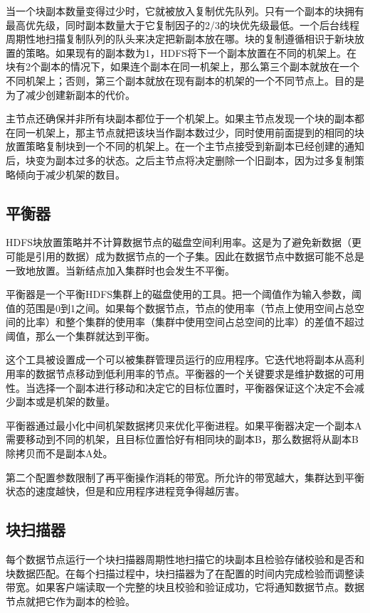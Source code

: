当一个块副本数量变得过少时，它就被放入复制优先队列。只有一个副本的块拥有最高优先级，同时副本数量大于它复制因子的2/3的块优先级最低。一个后台线程周期性地扫描复制队列的队头来决定把新副本放在哪。块的复制遵循相识于新块放置的策略。如果现有的副本数为1，HDFS将下一个副本放置在不同的机架上。在块有2个副本的情况下，如果连个副本在同一机架上，那么第三个副本就放在一个不同机架上；否则，第三个副本就放在现有副本的机架的一个不同节点上。目的是为了减少创建新副本的代价。

主节点还确保并非所有块副本都位于一个机架上。如果主节点发现一个块的副本都在同一机架上，那主节点就把该块当作副本数过少，同时使用前面提到的相同的块放置策略复制块到一个不同的机架上。在一个主节点接受到新副本已经创建的通知后，块变为副本过多的状态。之后主节点将决定删除一个旧副本，因为过多复制策略倾向于减少机架的数目。

\subsection{平衡器}

HDFS块放置策略并不计算数据节点的磁盘空间利用率。这是为了避免新数据（更可能是引用的数据）成为数据节点的一个子集。因此在数据节点中数据可能不总是一致地放置。当新结点加入集群时也会发生不平衡。

平衡器是一个平衡HDFS集群上的磁盘使用的工具。把一个阈值作为输入参数，阈值的范围是0到1之间。如果每个数据节点，节点的使用率（节点上使用空间占总空间的比率）和整个集群的使用率（集群中使用空间占总空间的比率）的差值不超过阈值，那么一个集群就达到平衡。

这个工具被设置成一个可以被集群管理员运行的应用程序。它迭代地将副本从高利用率的数据节点移动到低利用率的节点。平衡器的一个关键要求是维护数据的可用性。当选择一个副本进行移动和决定它的目标位置时，平衡器保证这个决定不会减少副本或是机架的数量。

平衡器通过最小化中间机架数据拷贝来优化平衡进程。如果平衡器决定一个副本A需要移动到不同的机架，且目标位置恰好有相同块的副本B，那么数据将从副本B除拷贝而不是副本A处。

第二个配置参数限制了再平衡操作消耗的带宽。所允许的带宽越大，集群达到平衡状态的速度越快，但是和应用程序进程竞争得越厉害。

\subsection{块扫描器}

每个数据节点运行一个块扫描器周期性地扫描它的块副本且检验存储校验和是否和块数据匹配。在每个扫描过程中，块扫描器为了在配置的时间内完成检验而调整读带宽。如果客户端读取一个完整的块且校验和验证成功，它将通知数据节点。数据节点就把它作为副本的检验。

